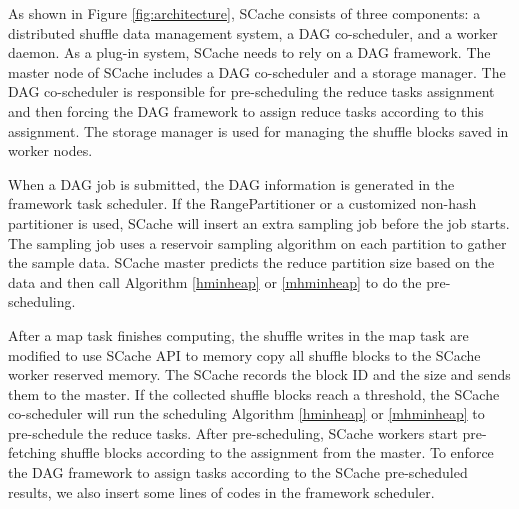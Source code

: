 {\color{black}
As shown in Figure \ref{fig:architecture}, SCache consists of three components: a distributed shuffle data management system, a DAG co-scheduler, and a worker daemon.
As a plug-in system, SCache needs to rely on a DAG framework. 
The master node of SCache includes a DAG co-scheduler and a storage manager.
The DAG co-scheduler is responsible for pre-scheduling the reduce tasks assignment and then forcing the DAG framework to assign reduce tasks according to this assignment.
The storage manager is used for managing the shuffle blocks saved in worker nodes.

When a DAG job is submitted, the DAG information is generated in the framework task scheduler. 
If the RangePartitioner or a customized non-hash partitioner is used, SCache will insert an extra sampling job before the job starts.
The sampling job uses a reservoir sampling algorithm \cite{reservoir} on each partition to gather the sample data.
SCache master predicts the reduce partition size based on the data and then call Algorithm \ref{hminheap} or \ref{mhminheap} to do the pre-scheduling.

After a map task finishes computing, the shuffle writes in the map task are modified to use SCache API to memory copy all shuffle blocks to the SCache worker reserved memory.
The SCache records the block ID and the size and sends them to the master.
If the collected shuffle blocks reach a threshold, the SCache co-scheduler will run the scheduling Algorithm \ref{hminheap} or \ref{mhminheap} to pre-schedule the reduce tasks.
After pre-scheduling, SCache workers start pre-fetching shuffle blocks according to the assignment from the master.
To enforce the DAG framework to assign tasks according to the SCache pre-scheduled results, we also insert some lines of codes in the framework scheduler.
}
